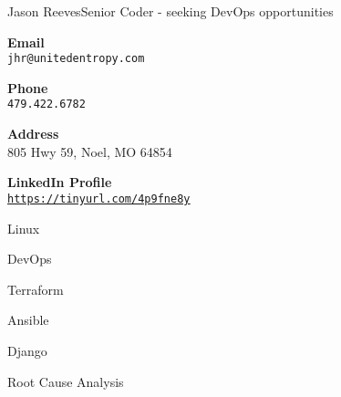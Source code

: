 \documentclass{article}
\begin{document}
\raggedbottom
\begin{cv}[avatar]{Jason Reeves}{Senior Coder - seeking DevOps opportunities}
\cvsidebar %



\begin{cvitem}[Envelope][4]
    \textbf{Email}\\
    \texttt{jhr@unitedentropy.com}
\end{cvitem}

\cvseparator[3]
\begin{cvitem}[Phone][4]
    \textbf{Phone}\\
    \texttt{479.422.6782}
\end{cvitem}

\cvseparator[3]
\begin{cvitem}[Home][4]
    \textbf{Address}\\
    805 Hwy 59, Noel, MO  64854
\end{cvitem}

\cvseparator[3]
\begin{cvitem}[Globe][4]
    \textbf{LinkedIn Profile}\\
    \href{https://tinyurl.com/4p9fne8y}{\underline{\texttt{https://tinyurl.com/4p9fne8y}}}
\end{cvitem}



\begin{cvitem}
    Linux
\end{cvitem}

\cvseparator
\begin{cvitem}
    DevOps
\end{cvitem}

\cvseparator
\begin{cvitem}
    Terraform
\end{cvitem}

\cvseparator
\begin{cvitem}
    Ansible
\end{cvitem}

\cvseparator
\begin{cvitem}
    Django
\end{cvitem}

\cvseparator
\begin{cvitem}
    Root Cause Analysis
\end{cvitem}


\end{cv}
\end{document}
